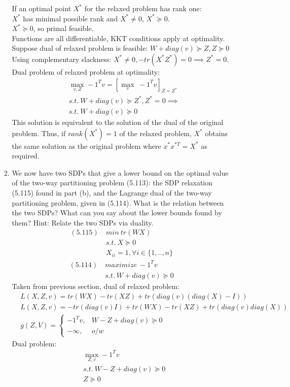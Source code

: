 \documentclass[12pt,letter]{article}
\begin{document}
\begin{enumerate}
\begin{enumerate}
\begin{enumerate}
    If an optimal point $X^*$ for the relaxed problem has rank one:\\
    $X^*$ has minimal possible rank and $X^*\not=0$, $X^*\succeq 0$.\\
    $X^*\succeq 0$, so primal feasible.\\
    Functions are all differentiable, KKT conditions apply at optimality.\\
    Suppose dual of relaxed problem is feasible: $W + diag(v) \succeq Z, Z\succeq 0$\\
    Using complementary slackness: $X^*\neq 0, -tr(X^*Z^*) = 0 \implies Z^* = 0$.\\
    Dual problem of relaxed problem at optimality:
    \begin{align*}
      &\max_{v,Z} -1^T v = [\max_{v}\ -1^T v]_{Z=Z^*}\\
      &s.t.\ W + diag(v) \succeq Z^*, Z^*=0 \implies \\
      &s.t.\ W + diag(v) \succeq 0
    \end{align*}
    This solution is equivalent to the solution of the dual of the original problem. Thus, if $rank(X^*)=1$ of the relaxed problem, $X^*$ obtains the same solution as the original problem where $x^*x^{*T}=X^*$ as required.
    \pagebreak
  \item
    We now have two SDPs that give a lower bound on the optimal value of the two-way partitioning problem (5.113): the SDP relaxation (5.115) found in part (b), and the Lagrange dual of the two-way partitioning problem, given in (5.114). What is the relation between the two SDPs? What can you say about the lower bounds found by them? Hint: Relate the two SDPs via duality.
    \begin{align*}
      (5.115)\ &min\ tr(W X)\\
               &s.t.\ X \succeq 0\\
               &X_{ii} = 1, \forall i \in \{1,..,n\}
    \end{align*}
    \begin{align*}
      (5.114)\ &maximize\ -1^T v\\
               &s.t.\ W + diag(v) \succeq 0
    \end{align*}    
    Taken from previous section, dual of relaxed problem:
    \begin{align*}
      &L(X,Z,v) = tr(WX) - tr(XZ) + tr(diag(v)(diag(X)-I))\\
      &L(X,Z,v) = -tr(diag(v)I) + tr(WX) - tr(XZ) + tr(diag(v)diag(X))\\
      &g(Z,V) =
        \begin{cases}
          -1^T v ,& W - Z + diag(v) \succeq 0\\
          -\infty ,& o/w
        \end{cases}
    \end{align*}
    Dual problem:
    \begin{align*}
      &\max_{Z,v} -1^T v\\
      &s.t.\ W - Z + diag(v) \succeq 0\\
        &Z \succeq 0
      \end{align*}


\end{enumerate}
\end{enumerate}
\end{enumerate}
\end{document}
